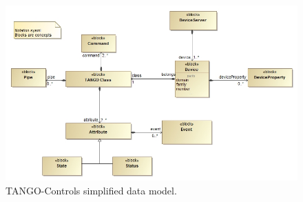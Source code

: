 \documentclass[a4paper]{spie}  %
\begin{document}
\begin{figure}[!htb]
   \centering
   \includegraphics*[width=1\columnwidth]{SimplifiedDataModel}
   \caption{TANGO-Controls simplified data model.}
   \label{fig:tangodatamodel}
\end{figure}
\end{document}
